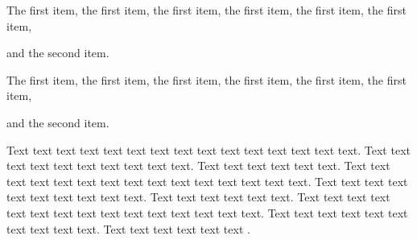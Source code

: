 \begin{listi}
	\item The first item, the first item, the first item, the first item, the first item, the first item,
	\item and the second item.
\end{listi}

\begin{lista}
	\item The first item, the first item, the first item, the first item, the first item, the first item, 
	\item and the second item.
\end{lista}

Text text text text text text text text text text text text text text text. Text text text text text text text text text text. Text text text text text text. Text text text text text text text text text text text text text text text. Text text text text text text text text text text. Text text text text text text. Text text text text text text text text text text text text text text text. Text text text text text text text text text text. Text text text text text text \citet{Blomstrom2003}. 